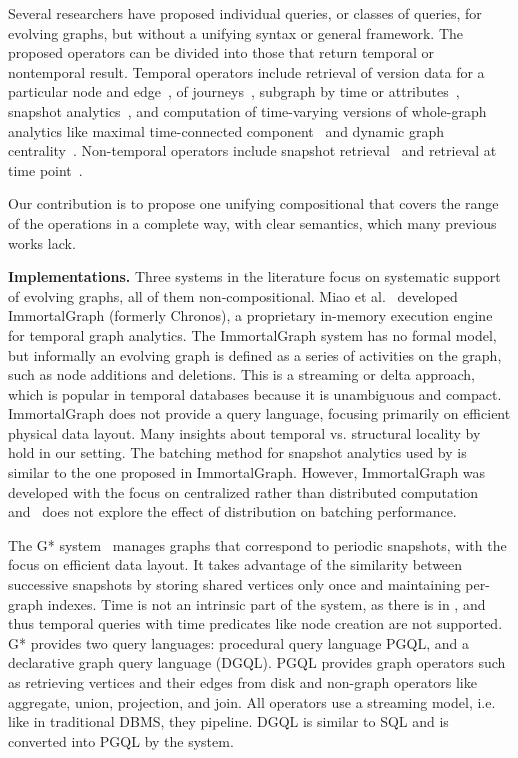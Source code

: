 Several researchers have proposed individual queries, or classes of
queries, for evolving graphs, but without a unifying syntax or general
framework.  The proposed operators can be divided into those that
return temporal or nontemporal result.  Temporal operators include
retrieval of version data for a particular node and
edge~\cite{George2006}, of journeys~\cite{George2009,Casteigts2011},
subgraph by time or attributes~\cite{Huo2014,Khurana2016}, snapshot
analytics~\cite{Miao2015,Labouseur2015,Khurana2016}, and computation
of time-varying versions of whole-graph analytics like maximal
time-connected component~\cite{Ferreira2004} and dynamic graph
centrality~\cite{Lerman2010}.  Non-temporal operators include snapshot
retrieval~\cite{Khurana2013} and retrieval at time
point~\cite{George2009,Khurana2016}.

Our contribution is to propose one unifying compositional \tga that
covers the range of the operations in a complete way, with clear
semantics, which many previous works lack.

{\bf Implementations.}  Three systems in the literature focus on
systematic support of evolving graphs, all of them non-compositional.
Miao et al.~\cite{Miao2015} developed ImmortalGraph (formerly
Chronos), a proprietary in-memory execution engine for temporal graph
analytics.  The ImmortalGraph system has no formal model, but
informally an evolving graph is defined as a series of activities on
the graph, such as node additions and deletions.  This is a streaming
or delta approach, which is popular in temporal databases because it
is unambiguous and compact.  ImmortalGraph does not provide a query
language, focusing primarily on efficient physical data layout.  Many
insights about temporal vs. structural locality by~\cite{Miao2015}
hold in our setting.  The batching method for snapshot analytics used
by \og is similar to the one proposed in ImmortalGraph.  However,
ImmortalGraph was developed with the focus on centralized rather than
distributed computation and~\cite{Miao2015} does not explore the
effect of distribution on batching performance.

The G* system~\cite{Labouseur2015} manages graphs that correspond to
periodic snapshots, with the focus on efficient data layout.  It takes
advantage of the similarity between successive snapshots by storing
shared vertices only once and maintaining per-graph indexes.  Time is
not an intrinsic part of the system, as there is in \tga, and thus
temporal queries with time predicates like node creation are not
supported.  G* provides two query languages: procedural query language
PGQL, and a declarative graph query language (DGQL). PGQL provides
graph operators such as retrieving vertices and their edges from disk
and non-graph operators like aggregate, union, projection, and join.
All operators use a streaming model, i.e. like in traditional DBMS,
they pipeline.  DGQL is similar to SQL and is converted into PGQL by
the system.

